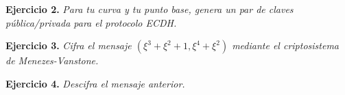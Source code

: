 \documentclass[fleqn]{article}
\begin{document}
    \newpage
    \textbf{Ejercicio 2. }\textit{Para tu curva y tu punto base, genera un par de claves pública/privada para el protocolo ECDH.}
    \vspace{0.5cm}


    \newpage
    \textbf{Ejercicio 3. }\textit{Cifra el mensaje $(\xi^3 + \xi^2 + 1, \xi^4 + \xi^2)$ mediante el criptosistema de Menezes-Vanstone.}
    \vspace{0.5cm}


    \newpage
    \textbf{Ejercicio 4. }\textit{Descifra el mensaje anterior.}
\end{document}
